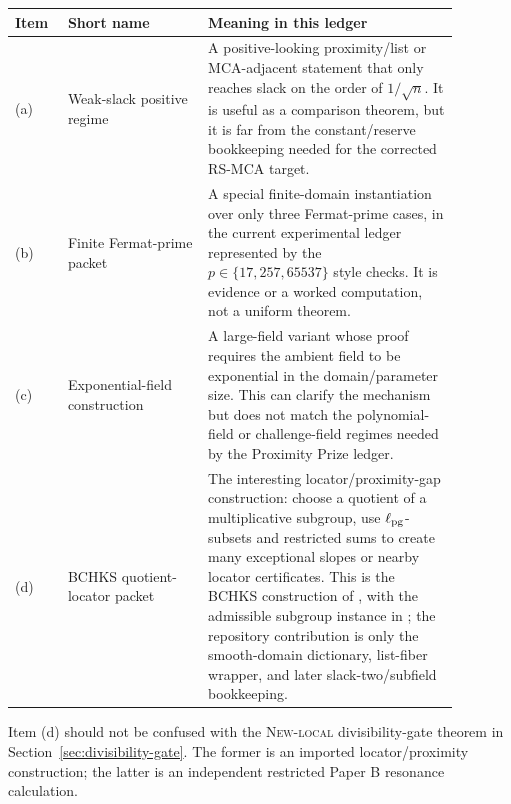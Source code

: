 \documentclass[11pt]{article}
\newcommand{\ellpg}{\ell_{\rm pg}}
\begin{document}
\begin{center}
\begin{tabular}{p{0.10\linewidth}p{0.28\linewidth}p{0.50\linewidth}}
\textbf{Item} & \textbf{Short name} & \textbf{Meaning in this ledger}\\
\hline
(a) & Weak-slack positive regime & A positive-looking proximity/list or
MCA-adjacent statement that only reaches slack on the order of
\(1/\sqrt n\).  It is useful as a comparison theorem, but it is far from the
constant/reserve bookkeeping needed for the corrected RS-MCA target.\\
(b) & Finite Fermat-prime packet & A special finite-domain instantiation over
only three Fermat-prime cases, in the current experimental ledger represented
by the \(p\in\{17,257,65537\}\) style checks.  It is evidence or a worked
computation, not a uniform theorem.\\
(c) & Exponential-field construction & A large-field variant whose proof
requires the ambient field to be exponential in the domain/parameter size.
This can clarify the mechanism but does not match the polynomial-field or
challenge-field regimes needed by the Proximity Prize ledger.\\
(d) & BCHKS quotient-locator packet & The interesting locator/proximity-gap
construction: choose a quotient of a multiplicative subgroup, use
\(\ellpg\)-subsets and restricted sums to create many exceptional slopes or
nearby locator certificates.  This is the BCHKS construction of
\cite[Thm.~7.1]{BCHKS25}, with the admissible subgroup instance in
\cite[Thm.~1.13]{BCHKS25}; the repository contribution is only the
smooth-domain dictionary, list-fiber wrapper, and later slack-two/subfield
bookkeeping.\\
\end{tabular}
\end{center}

Item (d) should not be confused with the \textsc{New-local} divisibility-gate
theorem in Section~\ref{sec:divisibility-gate}.  The former is an imported
locator/proximity construction; the latter is an independent restricted Paper
B resonance calculation.
\end{document}
